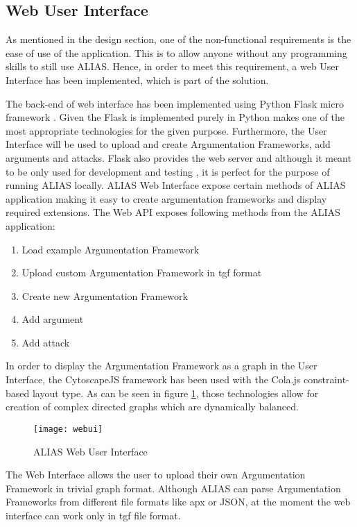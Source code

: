 \subsection{Web User Interface}
As mentioned in the design section, one of the non-functional requirements is the ease of use of the application. This is to allow anyone without any programming skills to still use ALIAS. Hence, in order to meet this requirement, a web User Interface has been implemented, which is part of the solution.

The back-end of web interface has been implemented using Python Flask micro framework \citep{flaskDocs}. Given the Flask is implemented purely in Python makes one of the most appropriate technologies for the given purpose. Furthermore, the User Interface will be used to upload and create Argumentation Frameworks, add arguments and attacks. Flask also provides the web server and although it meant to be only used for development and testing \citep{flaskBook}, it is perfect for the purpose of running ALIAS locally. ALIAS Web Interface expose certain methods of ALIAS application making it easy to create argumentation frameworks and display required extensions. The Web API exposes following methods from the ALIAS application:
\begin{enumerate}
	\item Load example Argumentation Framework
	\item Upload custom Argumentation Framework in tgf format
	\item Create new Argumentation Framework
	\item Add argument
	\item Add attack
\end{enumerate}

In order to display the Argumentation Framework as a graph in the User Interface, the CytoscapeJS \citep{cytoscapejs} framework has been used with the Cola.js constraint-based layout type. As can be seen in figure \ref{fig:webUi}, those technologies allow for creation of complex directed graphs which are dynamically balanced.

\begin{figure}[h]
	\texttt{[image: webui]}
	\caption{ALIAS Web User Interface}
	\label{fig:webUi}
\end{figure}

The Web Interface allows the user to upload their own Argumentation Framework in trivial graph format. Although ALIAS can parse Argumentation Frameworks from different file formats like apx or JSON, at the moment the web interface can work only in tgf file format. 

